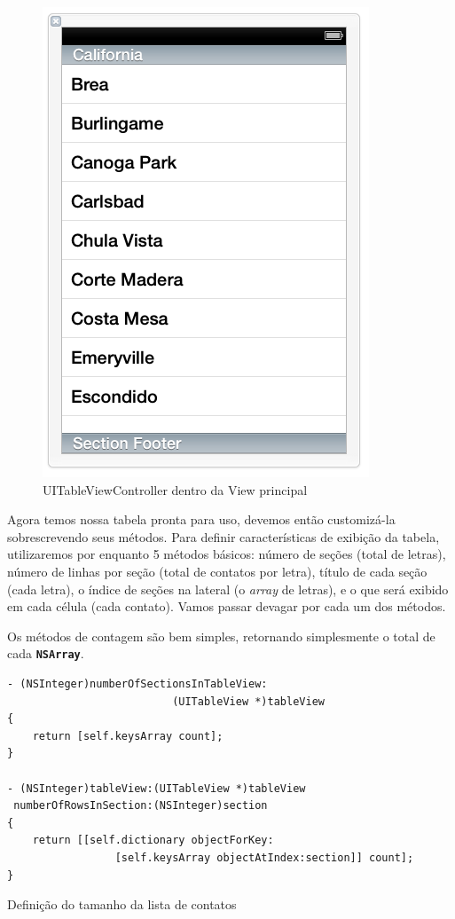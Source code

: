 \documentclass[a4paper,12pt,brazil,oneside]{book}
\begin{document}
\begin{figure}[H]
  \centering
  \includegraphics[width=.75\textwidth]{figuras/table/table9.png}
  \caption{UITableViewController dentro da View principal}
  \label{fig:a}
\end{figure}

Agora temos nossa tabela pronta para uso, devemos então customizá-la sobrescrevendo seus métodos. Para definir características de exibição da tabela, utilizaremos por enquanto 5 métodos básicos: número de seções (total de letras), número de linhas por seção (total de contatos por letra), título de cada seção (cada letra), o índice de seções na lateral (o \emph{array} de letras), e o que será exibido em cada célula (cada contato). Vamos passar devagar por cada um dos métodos.

Os métodos de contagem são bem simples, retornando simplesmente o total de cada \texttt{\textbf{NSArray}}.

\begin{listing}[H]
\begin{verbatim}
- (NSInteger)numberOfSectionsInTableView:
                          (UITableView *)tableView
{
    return [self.keysArray count];
}

- (NSInteger)tableView:(UITableView *)tableView
 numberOfRowsInSection:(NSInteger)section
{
    return [[self.dictionary objectForKey:
                 [self.keysArray objectAtIndex:section]] count];
}
\end{verbatim}
\caption{Definição do tamanho da lista de contatos}
\end{listing}
\end{document}
